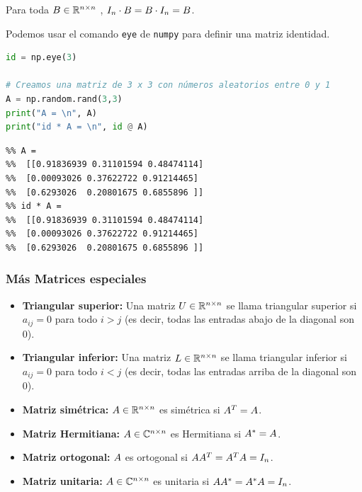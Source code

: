 \begin{proposicion}
Para toda $\Bb \in \R^{n \times n}$ , $I_n \cdot \Bb = \Bb \cdot I_n = \Bb$.
\end{proposicion}

Podemos usar el comando \texttt{eye} de \texttt{numpy} para definir una matriz identidad.

\begin{Shaded}
\begin{lstlisting}[language=Python]
id = np.eye(3)

# Creamos una matriz de 3 x 3 con números aleatorios entre 0 y 1
A = np.random.rand(3,3)
print("A = \n", A)
print("id * A = \n", id @ A)
\end{lstlisting}
\end{Shaded}

\begin{verbatim}
%% A =
%%  [[0.91836939 0.31101594 0.48474114]
%%  [0.00093026 0.37622722 0.91214465]
%%  [0.6293026  0.20801675 0.6855896 ]]
%% id * A =
%%  [[0.91836939 0.31101594 0.48474114]
%%  [0.00093026 0.37622722 0.91214465]
%%  [0.6293026  0.20801675 0.6855896 ]]
\end{verbatim}

\subsubsection{Más Matrices especiales}

\begin{itemize}
\item \textbf{Triangular superior:} Una matriz $\Ub \in \R^{n \times n}$ se llama triangular superior si $a_{ij} = 0$ para todo $i > j$ (es decir, todas las entradas abajo de la diagonal son 0).
\item \textbf{Triangular inferior:} Una matriz $\Lb \in \R^{n \times n}$ se llama triangular inferior si $a_{ij} = 0$ para todo $i < j$ (es decir, todas las entradas arriba de la diagonal son 0).
\item \textbf{Matriz simétrica:} $\Ab\in \R^{n\times n}$ es simétrica si $\Ab^T = \Ab$.
\item \textbf{Matriz Hermitiana:} $\Ab\in \C^{n\times n}$ es Hermitiana si $\Ab^* = \Ab$.
\item \textbf{Matriz ortogonal:} $\Ab$ es ortogonal si $\Ab\Ab^T = \Ab^T\Ab = \Id_n$.
\item \textbf{Matriz unitaria:} $\Ab\in \C^{n\times n}$ es unitaria si $\Ab\Ab^* = \Ab^*\Ab = \Id_n$.
\end{itemize}

